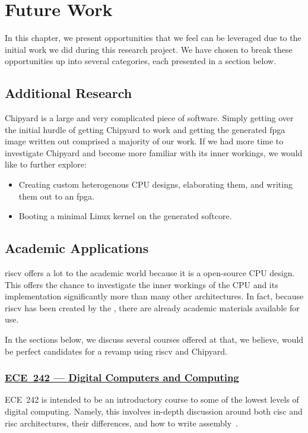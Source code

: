 \chapter{Future Work}\label{chap:Future_Work}
In this chapter, we present opportunities that we feel can be leveraged due to the initial work we did during this research project.
We have chosen to break these opportunities up into several categories, each presented in a section below.

\section{Additional Research}\label{sec:Additional_Research}
Chipyard is a large and very complicated piece of software.
Simply getting over the initial hurdle of getting Chipyard to work and getting the generated \Gls{fpga} image written out comprised a majority of our work.
If we had more time to investigate Chipyard and become more familiar with its inner workings, we would like to further explore:
\begin{itemize}
\item Creating custom heterogenous CPU designs, elaborating them, and writing them out to an \Gls{fpga}.
\item Booting a minimal Linux kernel on the generated \gls{softcore}.
\end{itemize}

\section{Academic Applications}\label{sec:Academic_Applications}
\Gls{riscv} offers a lot to the academic world because it is a open-source CPU design.
This offers the chance to investigate the inner workings of the CPU and its implementation significantly more than many other architectures.
In fact, because \Gls{riscv} has been created by the \UCB{}, there are already academic materials available for use.

In the sections below, we discuss several courses offered at \IIT{} that, we believe, would be perfect candidates for a revamp using \Gls{riscv} and Chipyard.

\subsection{\href{http://bulletin.iit.edu/search/?P=ECE 242}{ECE~242 --- Digital Computers and Computing}}\label{sec:ECE_242}
ECE~242 is intended to be an introductory course to some of the lowest levels of digital computing.
Namely, this involves in-depth discussion around both \Gls{cisc} and \Gls{risc} architectures, their differences, and how to write \gls{assembly}~\cite{iitECE242}.

